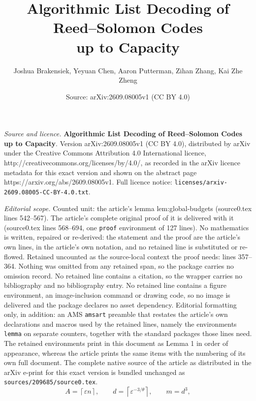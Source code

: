 \documentclass[10pt,a4paper]{amsart}
\title{\textbf{Algorithmic List Decoding of Reed--Solomon Codes\\ up to Capacity}}
\author{Joshua Brakensiek, Yeyuan Chen, Aaron Putterman, Zihan Zhang, Kai Zhe Zheng}
\date{Source: arXiv:2609.08005v1 (CC BY 4.0)}
\newcommand{\eps}{\varepsilon}
\begin{document}
\maketitle

\noindent\emph{Source and licence.} \textbf{Algorithmic List Decoding of Reed--Solomon Codes\\ up to Capacity}. Version arXiv:2609.08005v1 (CC BY 4.0), distributed by arXiv under the Creative Commons Attribution 4.0 International licence, http://creativecommons.org/licenses/by/4.0/, as recorded in the arXiv licence metadata for this exact version and shown on the abstract page https://arxiv.org/abs/2609.08005v1. Full licence notice: \texttt{licenses/arxiv-2609.08005-CC-BY-4.0.txt}.\par\smallskip

\noindent\textit{Editorial scope.} Counted unit: the article's lemma lem:global-budgets (source0.tex lines 542--567). The article's complete original proof of it is delivered with it (source0.tex lines 568--694, one \texttt{proof} environment of 127 lines). No mathematics is written, repaired or re-derived: the statement and the proof are the article's own lines, in the article's own notation, and no retained line is substituted or re-flowed.  Retained uncounted as the source-local context the proof needs: lines 357--364.  Nothing was omitted from any retained span, so the package carries no omission record.  No retained line contains a citation, so the wrapper carries no bibliography and no bibliography entry.  No retained line contains a figure environment, an image-inclusion command or drawing code, so no image is delivered and the package declares no asset dependency.  Editorial formatting only, in addition: an AMS \texttt{amsart} preamble that restates the article's own declarations and macros used by the retained lines, namely the environments \texttt{lemma} on separate counters, together with the standard packages those lines need.  The retained environments print in this document as Lemma 1 in order of appearance, whereas the article prints the same items with the numbering of its own full document.  The complete native source of the article as distributed in the arXiv e-print for this exact version is bundled unchanged as \texttt{sources/209685/source0.tex}.
\begin{equation} \label{eq:global_params}
A = \left\lceil
\eps n
\right\rceil, \qquad
d=\left\lceil \eps^{-3/\theta} \right \rceil,
\qquad
m=d^3,
\end{equation}
\end{document}

